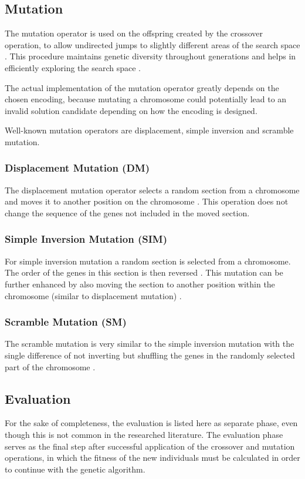 \documentclass[sigconf]{acmart}
\begin{document}
\subsection{Mutation}
The mutation operator is used on the offspring created by the crossover
operation, to allow undirected jumps to slightly different areas of the search
space \cite{Affenzeller2009}. This procedure maintains genetic diversity
throughout generations and helps in efficiently exploring the search space
\cite{Katoch2021, Affenzeller2009}.

The actual implementation of the mutation operator greatly depends on the chosen
encoding, because mutating a chromosome could potentially lead to an invalid
solution candidate depending on how the encoding is designed.

Well-known mutation operators are displacement, simple inversion and scramble
mutation.

\subsubsection{Displacement Mutation (DM)}
The displacement mutation operator selects a random section from a chromosome
and moves it to another position on the chromosome \cite{Katoch2021}.
This operation does not change the sequence of the genes not included in the
moved section.

\subsubsection{Simple Inversion Mutation (SIM)}
For simple inversion mutation a random section is selected from a chromosome.
The order of the genes in this section is then reversed \cite{Katoch2021}.
This mutation can be further enhanced by also moving the section to another
position within the chromosome (similar to displacement mutation)
\cite{Katoch2021}.

\subsubsection{Scramble Mutation (SM)}
The scramble mutation is very similar to the simple inversion mutation with the
single difference of not inverting but shuffling the genes in the randomly
selected part of the chromosome \cite{Katoch2021}.


\subsection{Evaluation}
For the sake of completeness, the evaluation is listed here as separate phase,
even though this is not common in the researched literature. The evaluation
phase serves as the final step after successful application of the crossover
and mutation operations, in which the fitness of the new individuals
must be calculated in order to continue with the genetic algorithm.
\end{document}
